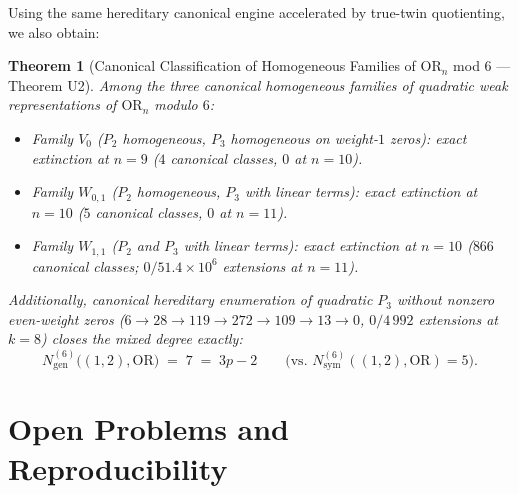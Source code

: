 \documentclass[11pt,a4paper]{article}
\newtheorem{theorem}{Theorem}[section]
\theoremstyle{definition}
\newcommand{\OR}{\mathrm{OR}}
\newcommand{\Nsym}{N_{\mathrm{sym}}}
\newcommand{\Ngen}{N_{\mathrm{gen}}}
\begin{document}
Using the same hereditary canonical engine accelerated by true-twin quotienting, we also obtain:
\begin{theorem}[Canonical Classification of Homogeneous Families of $\OR_n$ mod $6$ --- Theorem U2]
\label{thm:u2}
Among the three canonical homogeneous families of quadratic weak representations of $\OR_n$ modulo $6$:
\begin{itemize}[leftmargin=*,nosep]
  \item Family $V_0$ ($P_2$ homogeneous, $P_3$ homogeneous on weight-$1$ zeros): exact extinction at $n = 9$ ($4$ canonical classes, $0$ at $n = 10$).
  \item Family $W_{0,1}$ ($P_2$ homogeneous, $P_3$ with linear terms): exact extinction at $n = 10$ ($5$ canonical classes, $0$ at $n = 11$).
  \item Family $W_{1,1}$ ($P_2$ and $P_3$ with linear terms): exact extinction at $n = 10$ ($866$ canonical classes; $0 / 51.4 \times 10^6$ extensions at $n = 11$).
\end{itemize}
Additionally, canonical hereditary enumeration of quadratic $P_3$ without nonzero even-weight zeros ($6 \to 28 \to 119 \to 272 \to 109 \to 13 \to 0$, $0 / 4\,992$ extensions at $k = 8$) closes the mixed degree exactly:
\[
  \Ngen^{(6)}\bigl((1, 2), \OR\bigr) \;=\; 7 \;=\; 3p - 2 \qquad \bigl(\text{vs.\ } \Nsym^{(6)}((1, 2), \OR) = 5\bigr).
\]
\end{theorem}

\section{Open Problems and Reproducibility}
\label{sec:open}
\end{document}
